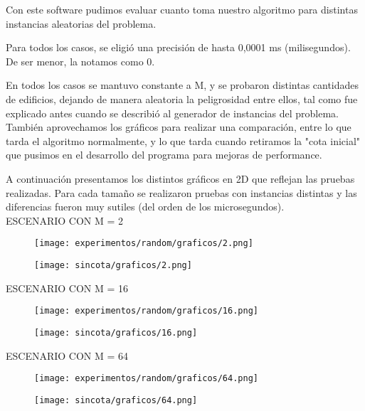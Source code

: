 Con este software pudimos evaluar cuanto toma nuestro algoritmo para distintas instancias aleatorias del problema.

Para todos los casos, se eligió una precisión de hasta 0,0001 ms (milisegundos). De ser menor, la notamos como 0.

En todos los casos se mantuvo constante a M, y se probaron distintas cantidades de edificios, dejando de manera aleatoria la peligrosidad entre ellos, tal como fue explicado antes cuando se describió al generador de instancias del problema.
También aprovechamos los gráficos para realizar una comparación, entre lo que tarda el algoritmo normalmente, y lo que tarda cuando retiramos la "cota inicial" que pusimos en el desarrollo del programa para mejoras de performance.

A continuación presentamos los distintos gráficos en 2D que reflejan las pruebas realizadas. Para cada tamaño se realizaron pruebas con instancias distintas y las diferencias fueron muy sutiles (del orden de los microsegundos).\\

\indent ESCENARIO CON M = 2
	\begin{figure}[h]
		\begin{center}
		   \texttt{[image: experimentos/random/graficos/2.png]}
		\end{center}
	\end{figure}
	\begin{figure}[h]
		\begin{center}
		   \texttt{[image: sincota/graficos/2.png]}
		\end{center}
	\end{figure}



\newpage\indent ESCENARIO CON M = 16
	\begin{figure}[h]
		\begin{center}
		   \texttt{[image: experimentos/random/graficos/16.png]}
		\end{center}
	\end{figure}
	\begin{figure}[h]
		\begin{center}
		   \texttt{[image: sincota/graficos/16.png]}
		\end{center}
	\end{figure}

 
\newpage\indent ESCENARIO CON M = 64
	\begin{figure}[h]
		\begin{center}
		   \texttt{[image: experimentos/random/graficos/64.png]}
		\end{center}
	\end{figure}
	\begin{figure}[h]
		\begin{center}
		   \texttt{[image: sincota/graficos/64.png]}
		\end{center}
	\end{figure}


